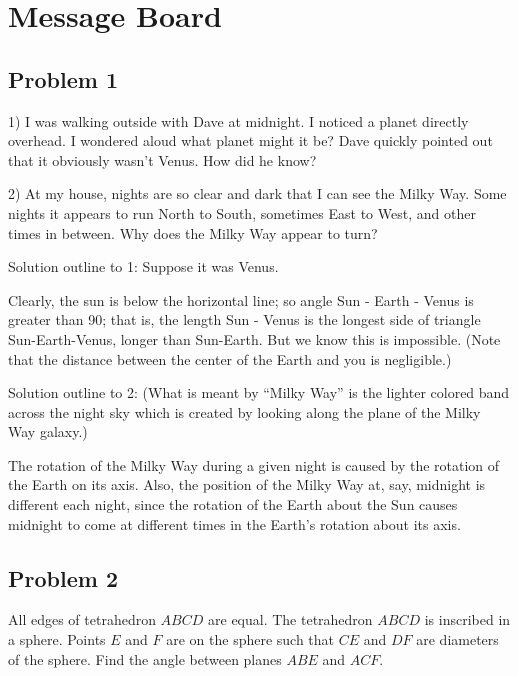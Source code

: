 \section{Message Board}

\subsection{Problem 1}

1) I was walking outside with Dave at midnight. I noticed a planet directly overhead. I wondered aloud what planet might it be? Dave quickly pointed out that it obviously wasn't Venus. How did he know?

2) At my house, nights are so clear and dark that I can see the Milky Way. Some nights it appears to run North to South, sometimes East to West, and other times in between. Why does the Milky Way appear to turn?

\begin{mdsoln}
Solution outline to 1:
Suppose it was Venus.

Clearly, the sun is below the horizontal line; so angle Sun - Earth - Venus is greater than 90; that is, the length Sun - Venus is the longest side of triangle Sun-Earth-Venus, longer than Sun-Earth. But we know this is impossible. (Note that the distance between the center of the Earth and you is negligible.)

\bigskip
Solution outline to 2:
(What is meant by “Milky Way” is the lighter colored band across the night sky which is created by looking along the plane of the Milky Way galaxy.)

The rotation of the Milky Way during a given night is caused by the rotation of the Earth on its axis. Also, the position of the Milky Way at, say, midnight is different each night, since the rotation of the Earth about the Sun causes midnight to come at different times in the Earth’s rotation about its axis.
    
\end{mdsoln}

\subsection{Problem 2}
All edges of tetrahedron $ABCD$ are equal. The tetrahedron $ABCD$ is inscribed in a sphere. Points $E$ and $F$ are on the sphere such that $CE$ and $DF$ are diameters of the sphere. Find the angle between planes $ABE$ and $ACF$.

